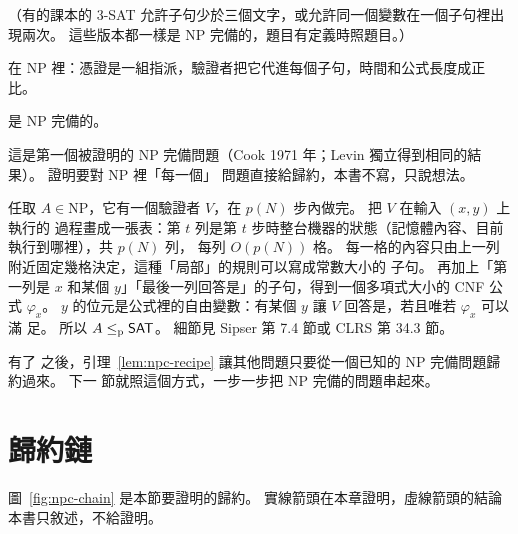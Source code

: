 （有的課本的 3-SAT 允許子句少於三個文字，或允許同一個變數在一個子句裡出現兩次。 這些版本都一樣是
NP 完備的，題目有定義時照題目。）

 在 NP 裡：憑證是一組指派，驗證者把它代進每個子句，時間和公式長度成正比。

\begin{theorem}
\label{thm:npc-cook}
 是 NP 完備的。
\end{theorem}

這是第一個被證明的 NP 完備問題（Cook 1971 年；Levin 獨立得到相同的結果）。 證明要對 NP 裡「每一個」
問題直接給歸約，本書不寫，只說想法。

\begin{whybox}
任取 $A \in \mathrm{NP}$，它有一個驗證者 $V$，在 $p(N)$ 步內做完。 把 $V$ 在輸入 $(x, y)$ 上執行的
過程畫成一張表：第 $t$ 列是第 $t$ 步時整台機器的狀態（記憶體內容、目前執行到哪裡），共 $p(N)$ 列，
每列 $O(p(N))$ 格。 每一格的內容只由上一列附近固定幾格決定，這種「局部」的規則可以寫成常數大小的
子句。 再加上「第一列是 $x$ 和某個 $y$」「最後一列回答是」的子句，得到一個多項式大小的 CNF 公式
$\varphi_x$。 $y$ 的位元是公式裡的自由變數：有某個 $y$ 讓 $V$ 回答是，若且唯若 $\varphi_x$ 可以滿
足。 所以 $A \le_{\mathrm{p}} \textsf{SAT}$。 細節見 Sipser 第 7.4 節或 CLRS 第 34.3 節。
\end{whybox}

有了  之後，引理~\ref{lem:npc-recipe} 讓其他問題只要從一個已知的 NP 完備問題歸約過來。 下一
節就照這個方式，一步一步把 NP 完備的問題串起來。

\section{歸約鏈}
\label{sec:npc-chain}

圖~\ref{fig:npc-chain} 是本節要證明的歸約。 實線箭頭在本章證明，虛線箭頭的結論本書只敘述，不給證明。

